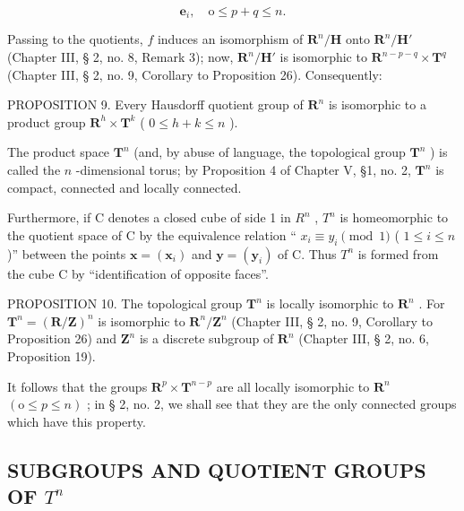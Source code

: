 \[
\boldsymbol {e} _ {i}, \quad \mathrm{o} \leqslant p + q \leqslant n.
\]

Passing to the quotients, \(f\) induces an isomorphism of \(\mathbf{R}^n / \mathbf{H}\) onto \(\mathbf{R}^n / \mathbf{H}'\) (Chapter III, § 2, no. 8, Remark 3); now, \(\mathbf{R}^n / \mathbf{H}'\) is isomorphic to \(\mathbf{R}^{n - p - q} \times \mathbf{T}^q\) (Chapter III, § 2, no. 9, Corollary to Proposition 26). Consequently:

PROPOSITION 9. Every Hausdorff quotient group of \(\mathbf{R}^{n}\) is isomorphic to a product group \(\mathbf{R}^{h} \times \mathbf{T}^{k}\) ( \(0 \leqslant h + k \leqslant n\) ).

The product space \(\mathbf{T}^n\) (and, by abuse of language, the topological group \(\mathbf{T}^n\) ) is called the \(n\) -dimensional torus; by Proposition 4 of Chapter V, §1, no. 2, \(\mathbf{T}^n\) is compact, connected and locally connected.

Furthermore, if C denotes a closed cube of side 1 in \(R^{n}\) , \(T^{n}\) is homeomorphic to the quotient space of C by the equivalence relation `` \(x_{i} \equiv y_{i} \pmod{1}\) ( \(1 \leqslant i \leqslant n\) )'' between the points \(\boldsymbol{x} = (\boldsymbol{x}_{i})\) and \(\boldsymbol{y} = (\boldsymbol{y}_{i})\) of C. Thus \(T^{n}\) is formed from the cube C by ``identification of opposite faces''.

PROPOSITION 10. The topological group \(\mathbf{T}^n\) is locally isomorphic to \(\mathbf{R}^n\) . For \(\mathbf{T}^n = (\mathbf{R}/\mathbf{Z})^n\) is isomorphic to \(\mathbf{R}^n/\mathbf{Z}^n\) (Chapter III, § 2, no. 9, Corollary to Proposition 26) and \(\mathbf{Z}^n\) is a discrete subgroup of \(\mathbf{R}^n\) (Chapter III, § 2, no. 6, Proposition 19).

It follows that the groups \(\mathbf{R}^p\times \mathbf{T}^{n - p}\) are all locally isomorphic to \(\mathbf{R}^n\) \((\mathrm{o}\leqslant p\leqslant n)\) ; in § 2, no. 2, we shall see that they are the only connected groups which have this property.

\subsection{\texorpdfstring{SUBGROUPS AND QUOTIENT GROUPS OF \(T^{n}\)}{SUBGROUPS AND QUOTIENT GROUPS OF T TO THE N}}


